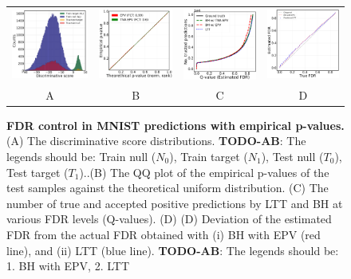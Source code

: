 \documentclass{article}
\newcommand{\todo}[2]{{\color{red} {\bf TODO-#1}: #2}}
\begin{document}
\begin{figure}
	\centering
	\begin{tabular}{cccc}
		\includegraphics[width=1.78in]{img/cls_overview.png}&
		\includegraphics[width=1.73in]{img/cnn_QQ_classical.png} &
		\includegraphics[width=1.69in]{img/cnn_classical_fdr_control.png} &
		\includegraphics[width=1.68in]{img/cnn_FDRQQ_classical.png} \\
		A & B & C & D \\
	\end{tabular}
	\caption{{\bf FDR control in MNIST predictions with empirical p-values. } (A) The discriminative score distributions. \todo{AB}{The legends should be: Train null ($N_0$), Train target ($N_1$), Test null ($T_0$), Test target ($T_1$).}.(B) The QQ plot of the empirical p-values of the test samples against the theoretical uniform distribution. (C) The number of true and accepted positive predictions by LTT and BH at various FDR levels (Q-values).  (D)  (D) Deviation of the estimated FDR from the actual FDR obtained with (i) BH with EPV (red line), and (ii) LTT (blue line). \todo{AB}{The legends should be: 1. BH with EPV, 2. LTT} }
	\label{fig:binary}
\end{figure}
 
\end{document}
